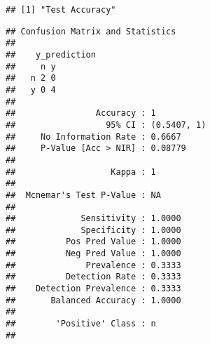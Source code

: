 \documentclass[
]{article}
\newenvironment{Shaded}{\begin{snugshade}}{\end{snugshade}}
\newcommand{\FunctionTok}[1]{\textcolor[rgb]{0.00,0.00,0.00}{#1}}
\newcommand{\NormalTok}[1]{#1}
\newcommand{\OtherTok}[1]{\textcolor[rgb]{0.56,0.35,0.01}{#1}}
\newcommand{\SpecialCharTok}[1]{\textcolor[rgb]{0.00,0.00,0.00}{#1}}
\begin{document}
\begin{verbatim}
## [1] "Test Accuracy"
\end{verbatim}

\begin{Shaded}
\end{Shaded}

\begin{verbatim}
## Confusion Matrix and Statistics
## 
##    y_prediction
##     n y
##   n 2 0
##   y 0 4
##                                      
##                Accuracy : 1          
##                  95% CI : (0.5407, 1)
##     No Information Rate : 0.6667     
##     P-Value [Acc > NIR] : 0.08779    
##                                      
##                   Kappa : 1          
##                                      
##  Mcnemar's Test P-Value : NA         
##                                      
##             Sensitivity : 1.0000     
##             Specificity : 1.0000     
##          Pos Pred Value : 1.0000     
##          Neg Pred Value : 1.0000     
##              Prevalence : 0.3333     
##          Detection Rate : 0.3333     
##    Detection Prevalence : 0.3333     
##       Balanced Accuracy : 1.0000     
##                                      
##        'Positive' Class : n          
## 
\end{verbatim}
\end{document}
